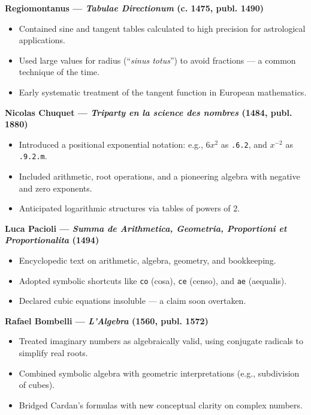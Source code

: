 \documentclass[9pt]{article}
\begin{document}
\textbf{Regiomontanus — \textit{Tabulae Directionum} (c. 1475, publ. 1490)}

\begin{itemize}
    \item Contained sine and tangent tables calculated to high precision for astrological applications.
    \item Used large values for radius (``\textit{sinus totus}'') to avoid fractions — a common technique of the time.
    \item Early systematic treatment of the tangent function in European mathematics.
\end{itemize}

\textbf{Nicolas Chuquet — \textit{Triparty en la science des nombres} (1484, publ. 1880)}

\begin{itemize}
    \item Introduced a positional exponential notation: e.g., $6x^2$ as \texttt{.6.2}, and $x^{-2}$ as \texttt{.9.2.m}.
    \item Included arithmetic, root operations, and a pioneering algebra with negative and zero exponents.
    \item Anticipated logarithmic structures via tables of powers of 2.
\end{itemize}

\textbf{Luca Pacioli — \textit{Summa de Arithmetica, Geometria, Proportioni et Proportionalita} (1494)}

\begin{itemize}
    \item Encyclopedic text on arithmetic, algebra, geometry, and bookkeeping.
    \item Adopted symbolic shortcuts like \texttt{co} (cosa), \texttt{ce} (censo), and \texttt{ae} (aequalis).
    \item Declared cubic equations insoluble — a claim soon overtaken.
\end{itemize}

\textbf{Rafael Bombelli — \textit{L'Algebra} (1560, publ. 1572)}

\begin{itemize}
    \item Treated imaginary numbers as algebraically valid, using conjugate radicals to simplify real roots.
    \item Combined symbolic algebra with geometric interpretations (e.g., subdivision of cubes).
    \item Bridged Cardan’s formulas with new conceptual clarity on complex numbers.
\end{itemize}
\end{document}
